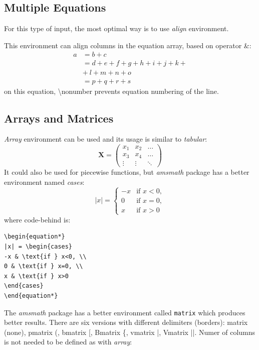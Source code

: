 \documentclass[10pt, a4paper]{article}
\begin{document}
\subsection{Multiple Equations}
For this type of input, the most optimal way is to use \emph{align} environment. 

This environment can align columns in the equation array, based on operator \&:
\begin{align}
a &= b + c\\
&= d+e+f+g+h+i+j+k+\nonumber\\
& +\: l + m + n + o \\
& = p +q +r +s
\end{align}
on this equation, \textbackslash nonumber prevents equation numbering of the line.

\subsection{Arrays and Matrices}
\emph{Array} environment can be used and its usage is similar to \emph{tabular}:
\begin{equation*}
\mathbf{X} = \left(
\begin{array}{ccc}
x_1 & x_2 & \ldots \\
x_3 & x_4 & \ldots \\
\vdots & \vdots & \ddots
\end{array} \right)
\end{equation*}
It could also be used for piecewise functions, but \emph{amsmath} package has a better environment named \textsl{cases}:
\begin{equation*}
|x| = \begin{cases}
-x & \text{if } x<0, \\
0 & \text{if } x=0, \\
x & \text{if } x>0
\end{cases}
\end{equation*}
where code-behind is:
\begin{verbatim}
\begin{equation*}
|x| = \begin{cases}
-x & \text{if } x<0, \\
0 & \text{if } x=0, \\
x & \text{if } x>0
\end{cases}
\end{equation*}
\end{verbatim}
The \emph{amsmath} package has a better environment called \texttt{matrix} which produces better results. There are six versions with different delimiters (borders): matrix (none), pmatrix (, bmatrix [, Bmatrix \{, vmatrix |, Vmatrix ||. Numer of columns is not needed to be defined as with \emph{array}:
\end{document}
